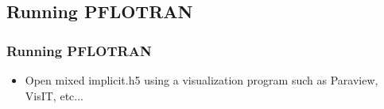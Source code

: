\documentclass{beamer}
\begin{document}
\subsection{Running PFLOTRAN}

\begin{frame}[fragile]\frametitle{Running PFLOTRAN}


\begin{itemize}
  \item Open mixed implicit.h5 using a visualization program such as Paraview, VisIT, etc...
\end{itemize}

\end{frame}
\end{document}
